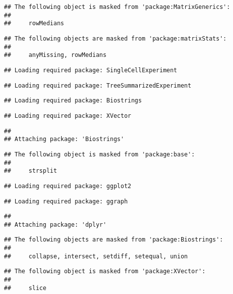 \documentclass[
  oneside]{book}
\begin{document}
\begin{verbatim}
## The following object is masked from 'package:MatrixGenerics':
## 
##     rowMedians
\end{verbatim}

\begin{verbatim}
## The following objects are masked from 'package:matrixStats':
## 
##     anyMissing, rowMedians
\end{verbatim}

\begin{verbatim}
## Loading required package: SingleCellExperiment
\end{verbatim}

\begin{verbatim}
## Loading required package: TreeSummarizedExperiment
\end{verbatim}

\begin{verbatim}
## Loading required package: Biostrings
\end{verbatim}

\begin{verbatim}
## Loading required package: XVector
\end{verbatim}

\begin{verbatim}
## 
## Attaching package: 'Biostrings'
\end{verbatim}

\begin{verbatim}
## The following object is masked from 'package:base':
## 
##     strsplit
\end{verbatim}

\begin{verbatim}
## Loading required package: ggplot2
\end{verbatim}

\begin{verbatim}
## Loading required package: ggraph
\end{verbatim}

\begin{verbatim}
## 
## Attaching package: 'dplyr'
\end{verbatim}

\begin{verbatim}
## The following objects are masked from 'package:Biostrings':
## 
##     collapse, intersect, setdiff, setequal, union
\end{verbatim}

\begin{verbatim}
## The following object is masked from 'package:XVector':
## 
##     slice
\end{verbatim}
\end{document}
